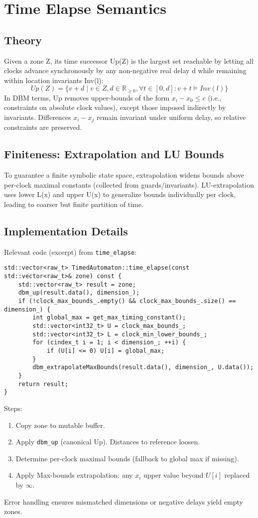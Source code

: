 \section{Time Elapse Semantics}
\subsection{Theory}
Given a zone Z, its time successor Up(Z) is the largest set reachable by letting all clocks advance synchronously by any non-negative real delay d while remaining within location invariants Inv(l):
\[
Up(Z) = \{ v + d \mid v \in Z, d \in \mathbb{R}_{\ge 0}, \forall t \in [0,d]: v+t \models Inv(l) \}
\]
In DBM terms, Up removes upper-bounds of the form \(x_i - x_0 \le c\) (i.e., constraints on absolute clock values), except those imposed indirectly by invariants. Differences \(x_i - x_j\) remain invariant under uniform delay, so relative constraints are preserved.

\subsection{Finiteness: Extrapolation and LU Bounds}
To guarantee a finite symbolic state space, extrapolation widens bounds above per-clock maximal constants (collected from guards/invariants). LU-extrapolation uses lower L(x) and upper U(x) to generalize bounds individually per clock, leading to coarser but finite partition of time.

\subsection{Implementation Details}
Relevant code (excerpt) from \texttt{time\_elapse}:
\begin{lstlisting}
std::vector<raw_t> TimedAutomaton::time_elapse(const std::vector<raw_t>& zone) const {
    std::vector<raw_t> result = zone;
    dbm_up(result.data(), dimension_);
    if (!clock_max_bounds_.empty() && clock_max_bounds_.size() == dimension_) {
        int global_max = get_max_timing_constant();
        std::vector<int32_t> U = clock_max_bounds_;
        std::vector<int32_t> L = clock_min_lower_bounds_;
        for (cindex_t i = 1; i < dimension_; ++i) {
            if (U[i] <= 0) U[i] = global_max;
        }
        dbm_extrapolateMaxBounds(result.data(), dimension_, U.data());
    }
    return result;
}
\end{lstlisting}
Steps:
\begin{enumerate}
  \item Copy zone to mutable buffer.
  \item Apply \texttt{dbm\_up} (canonical Up). Distances to reference loosen.
  \item Determine per-clock maximal bounds (fallback to global max if missing).
    \item Apply Max-bounds extrapolation: any \(x_i\) upper value beyond \(U[i]\) replaced by \(\infty\).
\end{enumerate}
Error handling ensures mismatched dimensions or negative delays yield empty zones.

